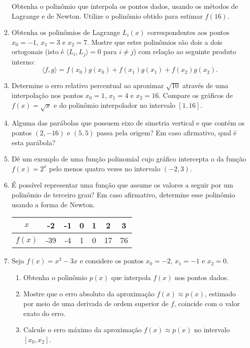 \documentclass[12pt,a4paper]{article}
\begin{document}
\begin{enumerate}
Obtenha o polinômio que interpola os pontos dados, usando os métodos de Lagrange e de Newton. Utilize o polinômio obtido para estimar $f(16)$.

\item Obtenha os polinômios de Lagrange $L_i(x)$ correspondentes aos pontos $x_0 = -1$, $x_1 = 3$ e $x_2 = 7$. Mostre que estes polinômios são dois a dois ortogonais (isto é $\langle L_i, L_j \rangle = 0$ para $i \neq j$) com relação ao seguinte produto interno:
\[
\langle f, g \rangle = f(x_0) g(x_0) + f(x_1) g(x_1) + f(x_2) g(x_2).
\]
\item Determine o erro relativo percentual ao aproximar $\sqrt{10}$ através de uma interpolação nos pontos $x_0 = 1$, $x_1 = 4$ e $x_2 = 16$. Compare os gráficos de $f(x) = \sqrt{x}$ e do polinômio interpolador no intervalo $[1,16]$.

\item Alguma das parábolas que possuem eixo de simetria vertical e que contém os pontos $(2, -16)$ e $(5, 5)$ passa pela origem? Em caso afirmativo, qual é esta parábola?
\item Dê um exemplo de uma função polinomial cujo gráfico intercepta o da função $f(x) = 2^x$ pelo menos quatro vezes no intervalo $(-2,3)$.
\item É possível representar uma função que assume os valores a seguir por um polinômio de terceiro grau? Em caso afirmativo, determine esse polinômio usando a forma de Newton.
\begin{center}
\begin{tabular}{|c|c|c|c|c|c|c|}
\hline
   $x$ & -2  & -1 & 0 & 1 &  2 & 3 \\
\hline
$f(x)$ & -39 & -4 & 1 & 0 & 17 & 76\\
\hline
\end{tabular}
\end{center}

\item Seja $f(x) = x^3 - 3x$ e considere os pontos $x_0 = -2$, $x_1 = -1$ e $x_2 = 0$.
\begin{enumerate}
\item Obtenha o polinômio $p(x)$ que interpola $f(x)$ nos pontos dados.
\item Mostre que o erro absoluto da aproximação $f(x) \approx p(x)$, estimado por meio de uma derivada de ordem superior de $f$, coincide com o valor exato do erro.
\item Calcule o erro máximo da aproximação $f(x)\approx p(x)$ no intervalo $[x_0, x_2]$.
\end{enumerate}


\end{enumerate}
\end{document}
